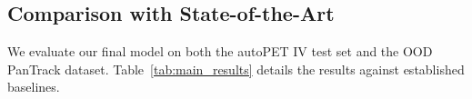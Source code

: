 
\subsection{Comparison with State-of-the-Art}

We evaluate our final model on both the autoPET IV test set and the OOD PanTrack dataset. Table~\ref{tab:main_results} details the results against established baselines.\\

